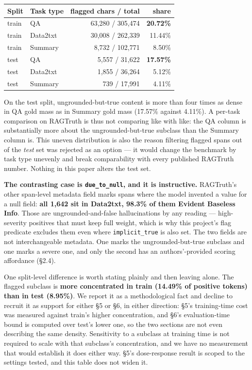 \documentclass[11pt]{article}
\newcounter{none}
\begin{document}
{\def\LTcaptype{none} %
\begin{longtable}[]{@{}llrr@{}}
\toprule\noalign{}
Split & Task type & flagged chars / total & share \\
\midrule\noalign{}
\endhead
\bottomrule\noalign{}
\endlastfoot
train & QA & 63,280 / 305,474 & \textbf{20.72\%} \\
train & Data2txt & 30,008 / 262,339 & 11.44\% \\
train & Summary & 8,732 / 102,771 & 8.50\% \\
test & QA & 5,557 / 31,622 & \textbf{17.57\%} \\
test & Data2txt & 1,855 / 36,264 & 5.12\% \\
test & Summary & 739 / 17,991 & 4.11\% \\
\end{longtable}
}

On the test split, ungrounded-but-true content is more than four times as dense in QA gold
mass as in Summary gold mass (17.57\% against 4.11\%). A per-task comparison on RAGTruth is
thus not comparing like with like: the QA column is substantially more about the
ungrounded-but-true subclass than the Summary column is. This uneven distribution is also the reason filtering
flagged spans out of the \emph{test} set was rejected as an option --- it would change the
benchmark by task type unevenly and break comparability with every published RAGTruth
number. Nothing in this paper alters the test set.

\textbf{The contrasting case is \texttt{due\_to\_null}, and it is instructive.} RAGTruth's other span-level
metadata field marks spans where the model invented a value for a null field: \textbf{all 1,642
sit in Data2txt, 98.3\% of them Evident Baseless Info}. Those are ungrounded-and-false
hallucinations by any reading --- high-severity positives that must keep full weight, which is
why this project's flag predicate excludes them even where \texttt{implicit\_true} is also set. The
two fields are not interchangeable metadata. One marks the ungrounded-but-true subclass and
one marks a severe one, and only the second has an authors'-provided scoring affordance
(§2.4).

One split-level difference is worth stating plainly and then leaving alone. The flagged
subclass is \textbf{more concentrated in train (14.49\% of positive tokens) than in test
(8.95\%)}. We report it as a methodological fact and decline to recruit it as support for
either §5 or §6, in either direction: §5's training-time cost was measured against train's
higher concentration, and §6's evaluation-time bound is computed over test's lower one, so
the two sections are not even describing the same density. Sensitivity to a subclass at
training time is not required to scale with that subclass's concentration, and we have no
measurement that would establish it does either way. §5's dose-response result is scoped to
the settings tested, and this table does not widen it.
\end{document}
